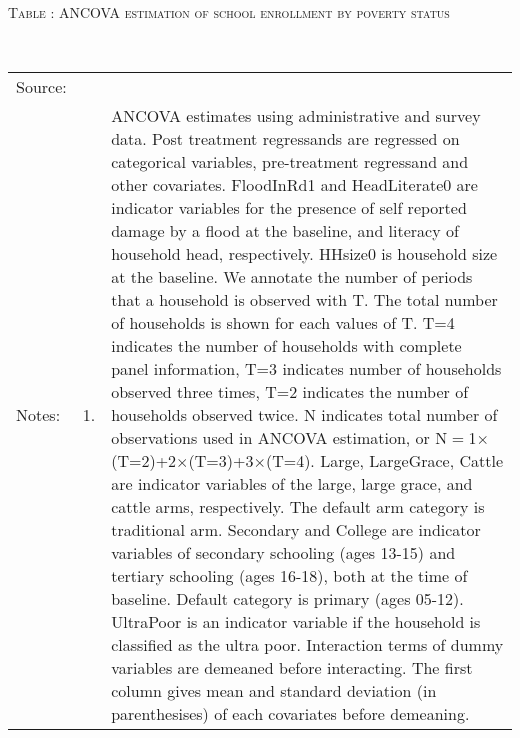 $  $\\
\phantom{a}\\

\vspace{-3.0cm}
\hspace{-1cm}\begin{minipage}[t]{14cm}
\hfil\textsc{\normalsize Table \thetable: ANCOVA estimation of school enrollment by poverty status\label{tab ANCOVA enroll poverty}}\\
\setlength{\tabcolsep}{1pt}
\setlength{\baselineskip}{8pt}
\renewcommand{\arraystretch}{.5}
\hfil{}\\
\renewcommand{\arraystretch}{.8}
\setlength{\tabcolsep}{1pt}
\hspace{-1cm}\begin{tabular}{>{\hfill\scriptsize}p{1cm}<{}>{\hfill\scriptsize}p{.25cm}<{}>{\scriptsize}p{14cm}<{\hfill}}
Source:& \multicolumn{2}{l}{\scriptsize Estimated with GUK administrative and survey data.}\\
Notes: & 1. & ANCOVA estimates using administrative and survey data. Post treatment regressands are regressed on categorical variables, pre-treatment regressand and other covariates. \textsf{FloodInRd1} and \textsf{HeadLiterate0} are indicator variables for the presence of self reported damage by a flood at the baseline, and literacy of household head, respectively. \textsf{HHsize0} is household size at the baseline. We annotate the number of periods that a household is observed with \textsf{T}. The total number of households is shown for each values of \textsf{T}. \textsf{T=4} indicates the number of households with complete panel information, \textsf{T=3} indicates number of households observed three times, \textsf{T=2} indicates the number of households observed twice. \textsf{N} indicates total number of observations used in ANCOVA estimation, or \textsf{N$=$1$\times$(T=2)+2$\times$(T=3)+3$\times$(T=4)}.  \textsf{Large}, \textsf{LargeGrace}, \textsf{Cattle} are indicator variables of the \textsf{large}, \textsf{large grace}, and \textsf{cattle} arms, respectively. The default arm category is \textsf{traditional} arm. \textsf{Secondary} and \textsf{College} are indicator variables of secondary schooling (ages 13-15) and tertiary schooling (ages 16-18), both at the time of baseline. Default category is primary (ages 05-12). \textsf{UltraPoor} is an indicator variable if the household is classified as the ultra poor. Interaction terms of dummy variables are demeaned before interacting. The first column gives mean and standard deviation (in parenthesises) of each covariates before demeaning.\\

\end{tabular}
\end{minipage}
